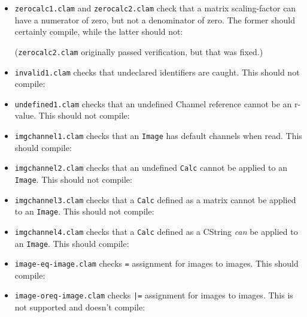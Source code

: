 \begin{itemize}

\item\texttt{zerocalc1.clam} and \texttt{zerocalc2.clam} check that a matrix scaling-factor can
have a numerator of zero, but not a denominator of zero.
The former should certainly compile, while the latter should not:


(\texttt{zerocalc2.clam} originally passed verification, but that was fixed.)

\item\texttt{invalid1.clam} checks that undeclared identifiers are caught. This should not compile:


\item\texttt{undefined1.clam} checks that an undefined Channel reference cannot be an r-value. This should not compile:


\item\texttt{imgchannel1.clam} checks that an \texttt{Image} has default channels when read. This should compile:


\item\texttt{imgchannel2.clam} checks that an undefined \texttt{Calc} cannot be applied to an \texttt{Image}. This should not compile:


\item\texttt{imgchannel3.clam} checks that a \texttt{Calc} defined as a matrix cannot be applied to an \texttt{Image}. This should not compile:


\item\texttt{imgchannel4.clam} checks that a \texttt{Calc} defined as a CString \emph{can} be applied to an \texttt{Image}. This should compile:


\item\texttt{image-eq-image.clam} checks \texttt{=} assignment for images to images. This should compile:


\item\texttt{image-oreq-image.clam} checks \texttt{|=} assignment for images to images. This is not supported and doesn't compile:



\end{itemize}
